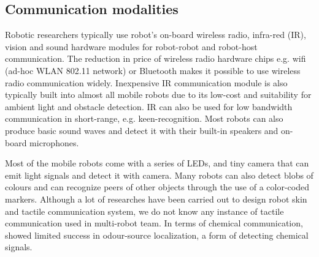 \documentclass{intech}
\begin{document}
\subsection{Communication modalities}
Robotic researchers typically use robot's on-board wireless radio, infra-red (IR), vision and sound hardware modules for robot-robot and robot-host communication. The reduction in price of wireless radio hardware chips e.g. wifi (ad-hoc WLAN 802.11 network) or Bluetooth makes it possible to use wireless radio communication widely. Inexpensive IR communication module is also typically built into almost all mobile robots due to its low-cost and suitability for ambient light and obstacle detection. IR can also be used for low bandwidth communication in short-range, e.g. keen-recognition. Most robots can also produce basic sound waves and detect it with their built-in speakers and on-board microphones. 

Most of the mobile robots come with a series of LEDs, and tiny camera that can emit light signals and detect it with camera. Many robots can also detect blobs of colours and can recognize peers of other objects through the use of a color-coded markers. Although a lot of researches have been carried out to design robot skin and tactile communication system, we do not know any instance of tactile communication used in multi-robot team. In terms of chemical communication, \cite{Lochmatter+2007} showed  limited success in odour-source localization, a form of detecting chemical signals.
\end{document}
